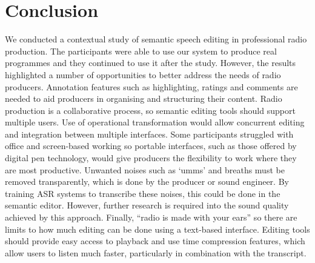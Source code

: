 \section{Conclusion}\label{sec:conclusion}
We conducted a contextual study of semantic speech editing in professional radio production. The participants were able
to use our system to produce real programmes and they continued to use it after the study.  However, the results
highlighted a number of opportunities to better address the needs of radio producers.
Annotation features such as highlighting, ratings and comments are needed to aid producers in organising and
structuring their content.
Radio production is a collaborative process, so semantic editing tools should support multiple users. Use of
operational transformation would allow concurrent editing and integration between multiple interfaces.
Some participants struggled with office and screen-based working so portable interfaces, such as those offered by
digital pen technology, would give producers the flexibility to work where they are most productive. 
Unwanted noises such as `umms' and breaths must be removed transparently, which is done by the producer or sound
engineer. By training ASR systems to transcribe these noises, this could be done in the semantic editor.
However, further research is required into the sound quality achieved by this approach.
Finally, ``radio is made with your ears'' so there are limits to how much editing can be done using a text-based
interface. Editing tools should provide easy access to playback and use time compression features, which allow users to
listen much faster, particularly in combination with the transcript.


